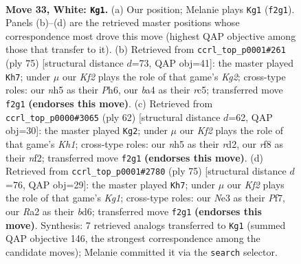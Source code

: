 \documentclass[11pt]{article}
\begin{document}
\clearpage

\begin{figure}[p]\centering
\begin{subfigure}{0.46\textwidth}\centering
\resizebox{\linewidth}{!}{%
\newchessgame
\chessboard[
  setfen={1n3r1k/6b1/BP6/p6n/b1P5/4N1P1/R4K2/1RB5 w - - 1 33},
  showmover=false,
  pgfstyle=straightmove, color=movearrow, markmove={f2-g1}
]}
\caption{}
\end{subfigure}\hfill
\begin{subfigure}{0.46\textwidth}\centering
\resizebox{\linewidth}{!}{%
\newchessgame
\chessboard[
  setfen={8/2p1r1k1/6np/2R3p1/3BP3/6b1/4K1P1/5B2 b - - 10 38},
  showmover=false,
  pgfstyle=straightmove, color=movearrow, markmove={g7-h7}
]}
\caption{}
\end{subfigure}
\\[4pt]
\begin{subfigure}{0.46\textwidth}\centering
\resizebox{\linewidth}{!}{%
\newchessgame
\chessboard[
  setfen={5k2/6bp/3p4/3N4/2B2P2/2P5/3r1n1P/5R1K w - - 7 32},
  showmover=false,
  pgfstyle=straightmove, color=movearrow, markmove={h1-g2}
]}
\caption{}
\end{subfigure}\hfill
\begin{subfigure}{0.46\textwidth}\centering
\resizebox{\linewidth}{!}{%
\newchessgame
\chessboard[
  setfen={4R1k1/5pp1/1b1B4/p4N1P/2n2P2/7K/8/2r5 b - - 1 38},
  showmover=false,
  pgfstyle=straightmove, color=movearrow, markmove={g8-h7}
]}
\caption{}
\end{subfigure}
\caption{\textbf{Move 33, White: \texttt{Kg1}.} (a) Our position; Melanie plays \texttt{Kg1} (\texttt{f2g1}). Panels (b)--(d) are the retrieved master positions whose correspondence most drove this move (highest QAP objective among those that transfer to it). (b) Retrieved from \texttt{ccrl\_top\_p0001\#261} (ply 75) [structural distance $d$=73, QAP obj=41]: the master played \texttt{Kh7}; under $\mu$ our \emph{Kf2} plays the role of that game's \emph{Kg2}; cross-type roles: our \emph{n}h5 as their \emph{P}h6, our \emph{b}a4 as their \emph{r}c5; transferred move \texttt{f2g1} \textbf{(endorses this move)}. (c) Retrieved from \texttt{ccrl\_top\_p0000\#3065} (ply 62) [structural distance $d$=62, QAP obj=30]: the master played \texttt{Kg2}; under $\mu$ our \emph{Kf2} plays the role of that game's \emph{Kh1}; cross-type roles: our \emph{n}h5 as their \emph{r}d2, our \emph{r}f8 as their \emph{n}f2; transferred move \texttt{f2g1} \textbf{(endorses this move)}. (d) Retrieved from \texttt{ccrl\_top\_p0001\#2780} (ply 75) [structural distance $d$=76, QAP obj=29]: the master played \texttt{Kh7}; under $\mu$ our \emph{Kf2} plays the role of that game's \emph{Kg1}; cross-type roles: our \emph{N}e3 as their \emph{P}f7, our \emph{R}a2 as their \emph{b}d6; transferred move \texttt{f2g1} \textbf{(endorses this move)}. Synthesis: 7 retrieved analogs transferred to \texttt{Kg1} (summed QAP objective 146, the strongest correspondence among the candidate moves); Melanie committed it via the \texttt{search} selector.}
\label{fig:thought-m64}
\end{figure}
\end{document}
